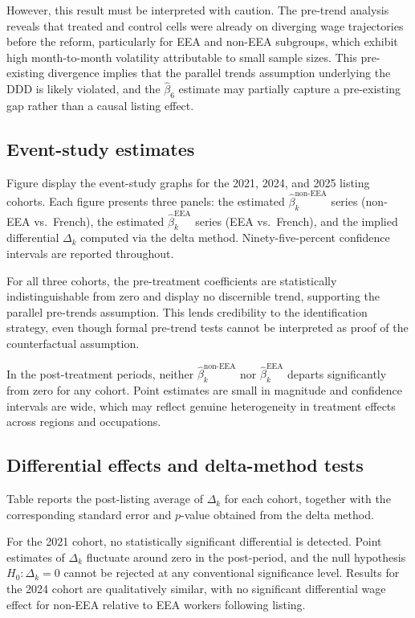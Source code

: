 \documentclass[9pt]{article}
\begin{document}
However, this result must be interpreted with caution. The pre-trend analysis
reveals that treated and control
cells were already on diverging wage trajectories before the reform, particularly for
EEA and non-EEA subgroups, which exhibit high month-to-month volatility attributable
to small sample sizes. This pre-existing divergence implies that the parallel trends
assumption underlying the DDD is likely violated, and the $\hat\beta_6$ estimate
may partially capture a pre-existing gap rather than a causal listing effect.

\subsection{Event-study estimates}

Figure %
display the event-study
graphs for the 2021, 2024, and 2025 listing cohorts. Each figure presents
three panels: the estimated $\hat\beta_k^{\text{non-EEA}}$ series (non-EEA
vs.\ French), the estimated $\hat\beta_k^{\text{EEA}}$ series (EEA
vs.\ French), and the implied differential $\Delta_k$ computed via the
delta method. Ninety-five-percent confidence intervals are reported
throughout.

For all three cohorts, the pre-treatment coefficients are statistically
indistinguishable from zero and display no discernible trend, supporting
the parallel pre-trends assumption. This lends credibility to the
identification strategy, even though formal pre-trend tests cannot be
interpreted as proof of the counterfactual assumption.

In the post-treatment periods, neither $\hat\beta_k^{\text{non-EEA}}$ nor
$\hat\beta_k^{\text{EEA}}$ departs significantly from zero for any cohort.
Point estimates are small in magnitude and confidence intervals are wide,
which may reflect genuine heterogeneity in
treatment effects across regions and occupations.

\subsection{Differential effects and delta-method tests}

Table %
reports the post-listing average of $\Delta_k$ for
each cohort, together with the corresponding standard error and $p$-value
obtained from the delta method.

For the 2021 cohort, no statistically significant differential is detected.
Point estimates of $\Delta_k$ fluctuate around zero in the post-period,
and the null hypothesis $H_0: \Delta_k = 0$ cannot be rejected at any
conventional significance level.  Results for the 2024 cohort are qualitatively similar, with no significant
differential wage effect for non-EEA relative to EEA workers following
listing.
\end{document}
